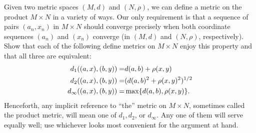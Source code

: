 \begin{exercise}{46}
Given two metric spaces $(M,d)$ and $(N,\rho)$, we can define a metric on the product $M\times N$ in a variety of ways. Our only requirement is that a sequence of pairs $(a_n,x_n)$ in $M\times N$ should converge precisely when both coordinate sequences $(a_n)$ and $(x_n)$ converge (in $(M,d)$ and $(N,\rho)$, respectively). Show that each of the following define metrics on $M\times N$ enjoy this property and that all three are equivalent:
\begin{align*}
    d_1((a,x),(b,y)) =& d(a,b)+\rho(x,y)\\
    d_2((a,x),(b,y)) =& (d(a,b)^2+\rho(x,y)^2)^{1/2}\\
    d_\infty((a,x),(b,y)) =& \max\{d(a,b),\rho(x,y)\}.
\end{align*}
Henceforth, any implicit reference to ``the'' metric on $M\times N$, sometimes called the product metric, will mean one of $d_1,d_2$, or $d_\infty$. Any one of them will serve equally well; use whichever looks most convenient for the argument at hand.
\end{exercise}
